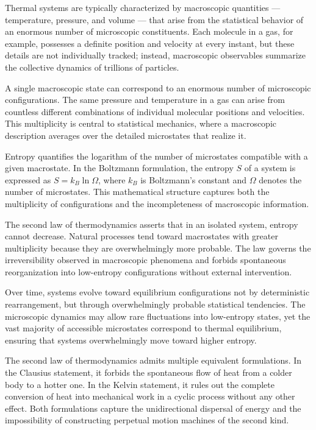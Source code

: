 Thermal systems are typically characterized by macroscopic quantities — temperature, pressure, and volume — that arise from the statistical behavior of an enormous number of microscopic constituents. Each molecule in a gas, for example, possesses a definite position and velocity at every instant, but these details are not individually tracked; instead, macroscopic observables summarize the collective dynamics of trillions of particles.

A single macroscopic state can correspond to an enormous number of microscopic configurations. The same pressure and temperature in a gas can arise from countless different combinations of individual molecular positions and velocities. This multiplicity is central to statistical mechanics, where a macroscopic description averages over the detailed microstates that realize it.

Entropy quantifies the logarithm of the number of microstates compatible with a given macrostate. In the Boltzmann formulation, the entropy $S$ of a system is expressed as $S = k_B \ln \Omega$, where $k_B$ is Boltzmann's constant and $\Omega$ denotes the number of microstates. This mathematical structure captures both the multiplicity of configurations and the incompleteness of macroscopic information.

The second law of thermodynamics asserts that in an isolated system, entropy cannot decrease. Natural processes tend toward macrostates with greater multiplicity because they are overwhelmingly more probable. The law governs the irreversibility observed in macroscopic phenomena and forbids spontaneous reorganization into low-entropy configurations without external intervention.


Over time, systems evolve toward equilibrium configurations not by deterministic rearrangement, but through overwhelmingly probable statistical tendencies. The microscopic dynamics may allow rare fluctuations into low-entropy states, yet the vast majority of accessible microstates correspond to thermal equilibrium, ensuring that systems overwhelmingly move toward higher entropy.

The second law of thermodynamics admits multiple equivalent formulations. In the Clausius statement, it forbids the spontaneous flow of heat from a colder body to a hotter one. In the Kelvin statement, it rules out the complete conversion of heat into mechanical work in a cyclic process without any other effect. Both formulations capture the unidirectional dispersal of energy and the impossibility of constructing perpetual motion machines of the second kind.

